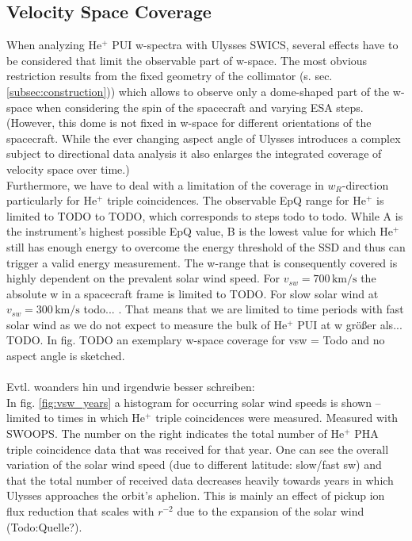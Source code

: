 \subsection{Velocity Space Coverage}
When analyzing $\mathrm{He^{+}}$ PUI w-spectra with Ulysses SWICS, several effects have to be considered that limit the observable part of w-space. The most obvious restriction results from the fixed geometry of the collimator (s. sec. \ref{subsec:construction})) which allows to observe only a dome-shaped part of the w-space when considering the spin of the spacecraft and varying ESA steps. (However, this dome is not fixed in w-space for different orientations of the spacecraft.
While the ever changing aspect angle of Ulysses introduces a complex subject to directional data analysis it also enlarges the integrated coverage of velocity space over time.)\\
Furthermore, we have to deal with a limitation of the coverage in $w_R$-direction particularly for $\mathrm{He^{+}}$ triple coincidences. The observable EpQ range for $\mathrm{He^{+}}$ is limited to TODO to TODO, which corresponds to steps todo to todo. While A is the instrument's highest possible EpQ value, B is the lowest value for which $\mathrm{He^{+}}$ still has enough energy to overcome the energy threshold of the SSD and thus can trigger a valid energy measurement. 
The w-range that is consequently covered is highly dependent on the prevalent solar wind speed. For $v_{sw} = 700 \,\mathrm{km/s}$ the absolute w in a spacecraft frame is limited to TODO. For slow solar wind at $v_{sw} = 300 \,\mathrm{km/s}$ todo... . 
That means that we are limited to time periods with fast solar wind as we do not expect to measure the bulk of $\mathrm{He^{+}}$ PUI at w größer als... TODO. In fig. TODO an exemplary w-space coverage for vsw = Todo and no aspect angle is sketched.
\\ \\
Evtl. woanders hin und irgendwie besser schreiben: \\
In fig. \ref{fig:vsw_years} a histogram for occurring solar wind speeds is shown -- limited to times in which $\mathrm{He^{+}}$ triple coincidences were measured. Measured with SWOOPS. The number on the right indicates the total number of $\mathrm{He^{+}}$ PHA triple coincidence data that was received for that year. One can see the overall variation of the solar wind speed (due to different latitude: slow/fast sw) and that the total number of received data decreases heavily towards years in which Ulysses approaches the orbit's aphelion. This is mainly an effect of pickup ion flux reduction that scales with $r^{-2}$ due to the expansion of the solar wind (Todo:Quelle?).
